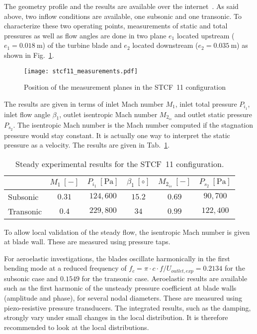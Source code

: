 The geometry profile and the results are available over the
internet~\cite{stcf11web}.
As said above, two inflow conditions are available, one subsonic and
one transonic. 
To characterize these two operating points, measurements of static and total pressures 
as well as flow angles are done in two plane $e_1$ located upstream 
($e_1 = 0.018~\text{m}$) of the turbine
blade and $e_2$ located downstream ($e_2 = 0.035~\text{m}$) as shown in Fig.~\ref{fig:stcf11_measurements}.
\begin{figure}[htbp]
  \centering
  \texttt{[image: stcf11\_measurements.pdf]}
  \caption{Position of the measurement planes in the STCF~11 configuration}
  \label{fig:stcf11_measurements}
\end{figure}
The results are given in terms of
inlet Mach number $M_1$, inlet total pressure $P_{i_1}$, 
inlet flow angle $\beta_1$, outlet isentropic
Mach number $M_{2_{is}}$ and outlet static pressure $P_{s_2}$. 
The isentropic Mach number is the Mach number 
computed if the stagnation pressure would stay constant. It is actually
one way to interpret the static pressure as a velocity.
The results are given in Tab.~\ref{tab:stcf11_steady_results}.
\begin{table}[htbp]
   \centering
  \begin{tabular}{lccccc}
    \toprule
    \phantom{abdefghijk}& $M_1~[-]$ & $P_{i_1}~[\text{Pa}]$ & $\beta_1~[\circ]$ & $M_{2_{is}}~[-]$ & $P_{s_2}~[\text{Pa}]$ \\
    \midrule
    Subsonic & $0.31$ & $124,600$ & $15.2$ & $0.69$  & $90,700$ \\
    Transonic & $0.4$ & $229,800$ & $34$    & $0.99$ & $122,400$ \\
    \bottomrule
  \end{tabular}
  \caption{Steady experimental results for the STCF~11 configuration.}
  \label{tab:stcf11_steady_results}
\end{table} 

To allow local validation of the steady
flow, the isentropic Mach number is given at blade wall. These
are measured using pressure taps.

For aeroelastic investigations, the blades oscillate harmonically in the first bending mode
at a reduced frequency of $f_{c} =\pi \cdot c \cdot
f/U_{outlet, exp} = 0.2134$ for the subsonic case and $0.1549$ for the
transonic case. Aeroelastic
results are available such as the first harmonic of the unsteady pressure
coefficient at blade walls (amplitude and phase), for several nodal
diameters. These are measured using piezo-resistive pressure transducers.
The integrated
results, such as the damping, strongly vary under small changes in the
local distribution. It is therefore recommended to look at the local
distributions.

